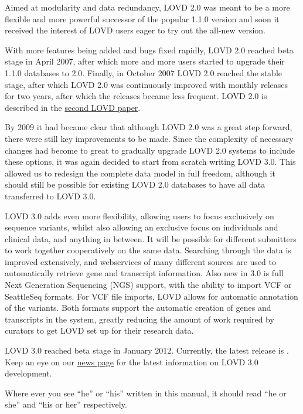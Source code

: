 \documentclass[a4paper,oneside,openany,12pt]{memoir}
\newcommand{\LOVDversion}{}                            %
\begin{document}
Aimed at modularity and data redundancy, LOVD 2.0 was meant to be a more flexible and more powerful successor of the popular 1.1.0 version
and soon it received the interest of LOVD users eager to try out the all-new version.
\par
With more features being added and bugs fixed rapidly, LOVD 2.0 reached beta stage in April 2007,
after which more and more users started to upgrade their 1.1.0 databases to 2.0.
Finally, in October 2007 LOVD 2.0 reached the stable stage, after which LOVD 2.0 was continuously improved with monthly releases for two years,
after which the releases became less frequent.
LOVD 2.0 is described in the \href{http://www.ncbi.nlm.nih.gov/pubmed/21520333}{second LOVD paper}.
\\
\par
By 2009 it had became clear that although LOVD 2.0 was a great step forward, there were still key improvements to be made.
Since the complexity of necessary changes had become to great to gradually upgrade LOVD 2.0 systems to include these options,
it was again decided to start from scratch writing LOVD 3.0.
This allowed us to redesign the complete data model in full freedom,
although it should still be possible for existing LOVD 2.0 databases to have all data transferred to LOVD 3.0.
\par
LOVD 3.0 adds even more flexibility, allowing users to focus exclusively on sequence variants,
whilst also allowing an exclusive focus on individuals and clinical data, and anything in between.
It will be possible for different submitters to work together cooperatively on the same data.
Searching through the data is improved extensively,
and webservices of many different sources are used to automatically retrieve gene and transcript information.
Also new in 3.0 is full Next Generation Sequencing (NGS) support,
with the ability to import VCF or SeattleSeq formats.
For VCF file imports, LOVD allows for automatic annotation of the variants.
Both formats support the automatic creation of genes and transcripts in the system,
greatly reducing the amount of work required by curators to get LOVD set up for their research data.
\par
LOVD 3.0 reached beta stage in January 2012.
Currently, the latest release is \LOVDversion.
Keep an eye on our \href{http://www.lovd.nl/3.0/news}{news page} for the latest information on LOVD 3.0 development.
\\
\par
Where ever you see ``he'' or ``his'' written in this manual, it should read ``he or she'' and ``his or her'' respectively.
\end{document}
